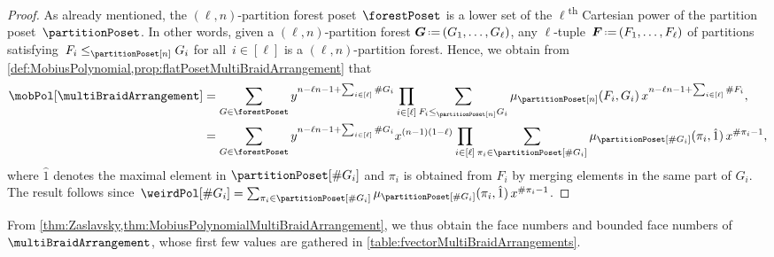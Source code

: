 \documentclass{amsart}
\theoremstyle{definition}
\renewcommand{\b}[1]{{\boldsymbol{#1}}} %
\newcommand{\eqdef}{\mbox{\,\raisebox{0.2ex}{\scriptsize\ensuremath{\mathrm:}}\ensuremath{=}\,}} %
\newcommand{\card}[1]{\##1} %
\newcommand{\ordinal}{\textsuperscript{th}} %
\renewcommand{\b}[1]{\boldsymbol{#1}} %
\begin{document}
\begin{proof}
As already mentioned, the $(\ell,n)$-partition forest poset~$\forestPoset$ is a lower set of the $\ell$\ordinal{} Cartesian power of the partition poset~$\partitionPoset$.
In other words, given a $(\ell,n)$-partition forest $\b{G} \eqdef (G_1, \dots, G_\ell)$, any $\ell$-tuple~$\b{F} \eqdef (F_1, \dots, F_\ell)$ of partitions satisfying~$F_i \le_{\partitionPoset[n]} G_i$ for all~$i \in [\ell]$ is a $(\ell,n)$-partition forest.
Hence, we obtain from \cref{def:MobiusPolynomial,prop:flatPosetMultiBraidArrangement} that
\begin{align*}
\mobPol[\multiBraidArrangement]
& = \sum_{G \in \forestPoset} y^{n-\ell n - 1 + \sum_{i \in [\ell]} \card{G_i}} \prod_{i \in [\ell]} \sum_{F_i \leq_{\partitionPoset[n]} G_i } \mu_{\partitionPoset[n]}(F_i,G_i) \, x^{n-\ell n - 1 + \sum_{i \in [\ell]} \card{F_i}}, \\
& = \sum_{G \in \forestPoset} y^{n-\ell n - 1 + \sum_{i \in [\ell]} \card{G_i}} x^{(n-1)(1-\ell)} \prod_{i \in [\ell]} \sum_{\pi_i \in \partitionPoset[\card{G_i}]}  \mu_{\partitionPoset[\card{G_i}]}(\pi_i,\hat{1}) \, x^{\card{\pi_i}-1}, 
\end{align*}
where $\hat{1}$ denotes the maximal element in $\partitionPoset[\card{G_i}]$ and $\pi_i$ is obtained from $F_i$ by merging elements in the same part of $G_i$.
The result follows since~$\weirdPol[\card{G_i}] = \sum_{\pi_i \in \partitionPoset[\card{G_i}]}  \mu_{\partitionPoset[\card{G_i}]}(\pi_i,\hat{1}) \, x^{\card{\pi_i}-1}$.
\end{proof}

From \cref{thm:Zaslavsky,thm:MobiusPolynomialMultiBraidArrangement}, we thus obtain the face numbers and bounded face numbers of~$\multiBraidArrangement$, whose first few values are gathered in \cref{table:fvectorMultiBraidArrangements}.
\end{document}
